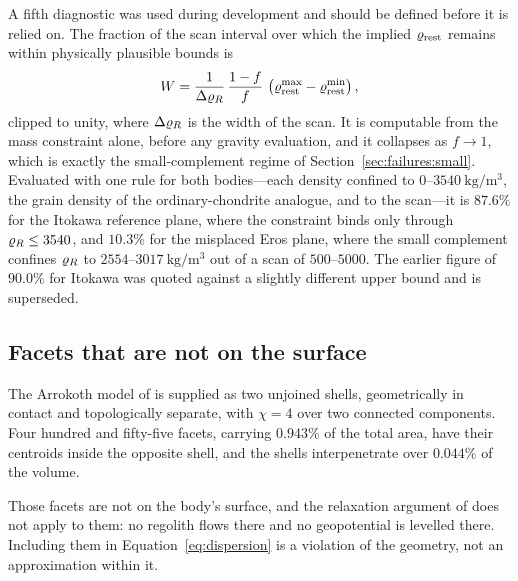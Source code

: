 A fifth diagnostic was used during development and should be defined
before it is relied on. The fraction of the scan interval over which the
implied $\varrho_{\mathrm{rest}}$ remains within physically plausible bounds is
%
\begin{equation}
W = \frac{1}{\Delta\varrho_{R}}\,\frac{1-f}{f}\,
    \left(\varrho_{\mathrm{rest}}^{\max}-\varrho_{\mathrm{rest}}^{\min}\right) ,
\label{eq:window}
\end{equation}
%
clipped to unity, where $\Delta\varrho_{R}$ is the width of the scan. It is
computable from the mass constraint alone, before any gravity evaluation,
and it collapses as $f \to 1$, which is exactly the small-complement
regime of Section~\ref{sec:failures:small}. Evaluated with one rule for both bodies---each density confined to
$0$--$\SI{3540}{\kilo\gram\per\cubic\metre}$, the grain density of the
ordinary-chondrite analogue, and to the scan---it is $87.6\%$ for the
Itokawa reference plane, where the constraint binds only through
$\varrho_{R} \le 3540$, and $10.3\%$ for the misplaced Eros plane, where the
small complement confines $\varrho_{R}$ to $2554$--$\SI{3017}{\kilo\gram\per\cubic\metre}$
out of a scan of $500$--$5000$. The earlier figure of $90.0\%$ for Itokawa
was quoted against a slightly different upper bound and is superseded.

\subsection{Facets that are not on the surface}
\label{sec:failures:buried}

The Arrokoth model of \citet{porter2024} is supplied as two unjoined
shells, geometrically in contact and topologically separate, with
$\chi = 4$ over two connected components. Four hundred and fifty-five
facets, carrying $0.943\%$ of the total area, have their centroids inside
the opposite shell, and the shells interpenetrate over $0.044\%$ of the
volume.

Those facets are not on the body's surface, and the relaxation argument of
\citet{richardson2014} does not apply to them: no regolith flows there and
no geopotential is levelled there. Including them in
Equation~\eqref{eq:dispersion} is a violation of the geometry, not an
approximation within it.

